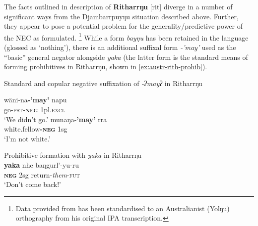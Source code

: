 \documentclass[output=paper,draft,draftmode,colorlinks,citecolor=brown]{langscibook}
\begin{document}
The facts outlined in  description of {\bf
Ritharrŋu} [rit] diverge in a number of significant ways
from the Djambarrpuyŋu situation described above. Further, they appear to
pose a potential problem for the generality\slash predictive power of the
NEC as formulated.%
%
\footnote{Data provided from \citet{Heath1980} has been standardised to an Australianist (Yolŋu) orthography from his original IPA transcription.} 
%
While a form \textit{bayŋu} has been retained in the language (glossed as `nothing'), there is an additional suffixal form \textit{-'may'} used as the ``basic'' \citep[101]{Heath1980} general negator alongside \textit{yaka} (the latter form is the standard means of forming prohibitives in Ritharrŋu, shown in \ref{ex:austr-rith-prohib}).
%
\begin{exe}\ex Standard and copular negative suffixation of {\em -ʔmayʔ} in Ritharrŋu
    \begin{xlist}
    \ex\label{ex:austr-rith-negsuffix-go}
    \gll wäni-na\textbf{-'may'} napu\\
go-\textsc{pst-\textbf{neg}} 1pl\textsc{.excl}\\
\glt  `We didn't go.'
\ex\gll munaŋa-\textbf{'may'} rra\\
white.fellow\textsc{\textbf{-neg}} 1sg\\
\glt `I'm not white.'\end{xlist}
%
\ex \label{ex:austr-rith-prohib} Prohibitive formation with {\em yaka} in Ritharrŋu\\
\gll \textbf{yaka} nhe baŋgurl'-yu-ru\\
\textsc{\textbf{neg}} 2sg return-\textit{them}-\textsc{fut}\\
\glt `Don't come back!'\\\end{exe}
\end{document}
